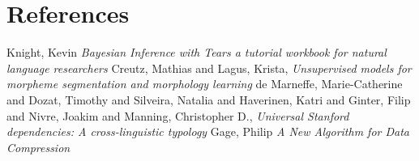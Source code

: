 \documentclass[11pt,a4paper]{article}
\begin{document}
\section{References}
\begin{thebibliography}{9}

  Knight, Kevin
  \textit{Bayesian Inference with Tears 
  a tutorial workbook for natural language researchers}
    Creutz, Mathias and Lagus, Krista,
    \textit{Unsupervised models for morpheme segmentation and morphology 
    learning}
    de Marneffe, Marie-Catherine  and
      Dozat, Timothy  and
      Silveira, Natalia  and
      Haverinen, Katri  and
      Ginter, Filip  and
      Nivre, Joakim  and
      Manning, Christopher D.,
      \textit{Universal Stanford dependencies: A cross-linguistic typology}
      Gage, Philip
      \textit{A New Algorithm for Data Compression}
\end{thebibliography}
\end{document}
